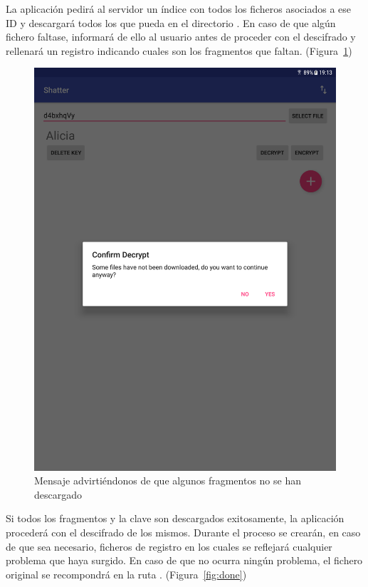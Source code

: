 La aplicación pedirá al servidor un índice con todos los ficheros asociados a
ese ID y descargará todos los que pueda en el directorio .
En caso de que algún fichero faltase, informará de ello al usuario antes de
proceder con el descifrado y rellenará un registro indicando cuales son los
fragmentos que faltan. (Figura~\ref{fig:miss})

\begin{figure}[ht]
  \centering
  \includegraphics[scale=0.2]{Figures/miss}
  \decoRule
  \caption[Shatter (Faltan fragmentos)]{Mensaje advirtiéndonos de que algunos
  fragmentos no se han descargado}
  \label{fig:miss}
\end{figure}

Si todos los fragmentos y la clave son descargados exitosamente, la aplicación
procederá con el descifrado de los mismos. Durante el proceso se crearán, en
caso de que sea necesario, ficheros de registro en los cuales se reflejará
cualquier problema que haya surgido. En caso de que no ocurra ningún
problema, el fichero original se recompondrá en la ruta
. (Figura~\ref{fig:done})

